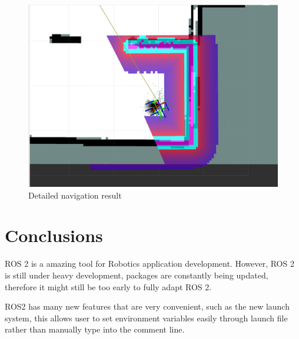 \documentclass[letterpaper, 10 pt, conference]{ieeeconf}  %
\begin{document}
\begin{figure}[ht]
  \includegraphics[width=\linewidth]{navigation_detail.png}
  \caption{Detailed navigation result} 
  \label{fig:navigation_detail}
\end{figure}{}
\section{Conclusions}\label{conclusions}
ROS 2 is a amazing tool for Robotics application development. However, ROS 2 is still under heavy development, packages are constantly being updated, therefore it might still be too early to fully adapt ROS 2. 


ROS2 has many new features that are very convenient, such as the new launch system, this allows user to set environment variables easily through launch file rather than manually type into the comment line. 
\addtolength{\textheight}{-12cm}   %
\end{document}
